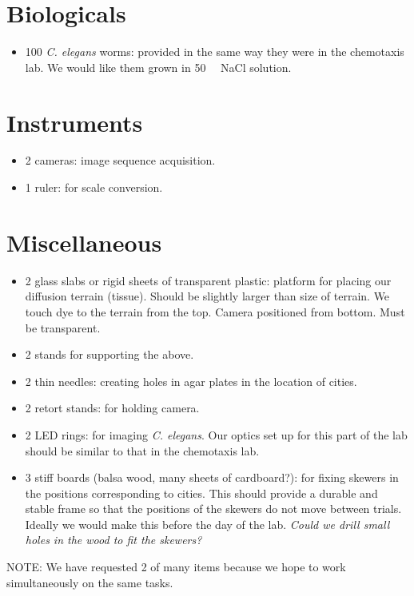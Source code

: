 \documentclass[11pt]{article}
\begin{document}
\section{Biologicals}

\begin{itemize}

	\item 100 \emph{C. elegans} worms: provided in the same way they were in the chemotaxis lab. We would like them grown in \SI{50}{\milli \molar} NaCl solution. 
	
\end{itemize}


\section{Instruments}

\begin{itemize}

	\item 2 cameras: image sequence acquisition. 
	
	\item 1 ruler: for scale conversion.
	
\end{itemize}


\section{Miscellaneous}

\begin{itemize}

	\item 2 glass slabs or rigid sheets of transparent plastic: platform for placing our diffusion terrain (tissue). Should be slightly larger than size of terrain. We touch dye to the terrain from the top. Camera positioned from bottom. Must be transparent.
	
	\item 2 stands for supporting the above. 
	
	\item 2 thin needles: creating holes in agar plates in the location of cities.
		
	\item 2 retort stands: for holding camera.
	
	\item 2 LED rings: for imaging \emph{C. elegans}. Our optics set up for this part of the lab should be similar to that in the chemotaxis lab.
	
	\item 3 stiff boards (balsa wood, many sheets of cardboard?): for fixing skewers in the positions corresponding to cities. This should provide a durable and stable frame so that the positions of the skewers do not move between trials. Ideally we would make this before the day of the lab. \emph{Could we drill small holes in the wood to fit the skewers?}
	
\end{itemize}

NOTE: We have requested 2 of many items because we hope to work simultaneously on the same tasks. 
\end{document}
